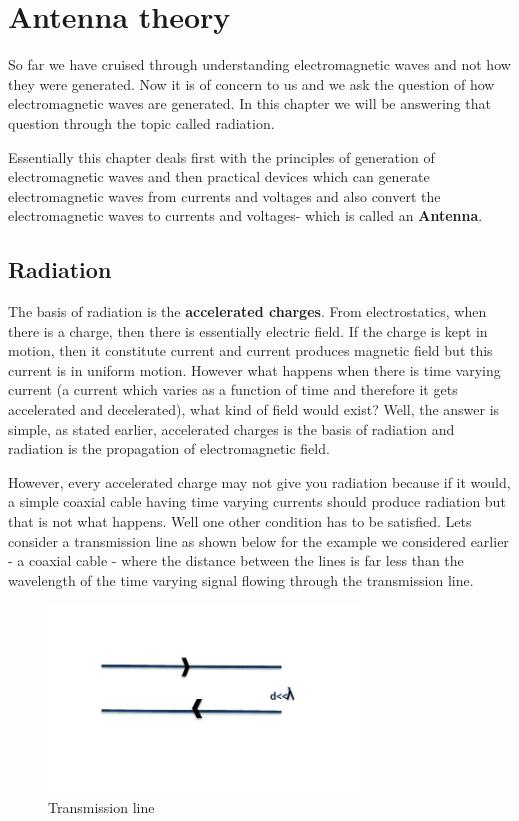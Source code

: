 \chapter{Antenna theory}
So far we have cruised through understanding electromagnetic waves and not how they were generated. Now it is of concern to us and we ask the question of how electromagnetic waves are generated. In this chapter we will be answering that question through the topic called radiation. 

Essentially this chapter deals first with the principles of generation of electromagnetic waves and then practical devices which can generate electromagnetic waves from currents and voltages and also convert the electromagnetic waves to currents and voltages- which is called an \textbf{Antenna}.

\section{Radiation}
The basis of radiation is the \textbf{accelerated charges}. From electrostatics, when there is a charge, then there is essentially electric field. If the charge is kept in motion, then it constitute current and current produces magnetic field but this current is in uniform motion. However what happens when there is time varying current (a current which varies as a function of time and therefore it gets accelerated and decelerated), what kind of field would exist? Well, the answer is simple, as stated earlier, accelerated charges is the basis of radiation and radiation is the propagation of electromagnetic field.

However, every accelerated charge may not give you radiation because if it would, a simple coaxial cable having time varying currents should produce radiation but that is not what happens. Well one other condition has to be satisfied. Lets consider a transmission line as shown below for the example we considered earlier - a coaxial cable - where the distance between the lines is far less than the wavelength of the time varying signal flowing through the transmission line.
\begin{figure}[h]
\centering
\includegraphics[height=5cm]{./graphics/fig_1}
\caption{Transmission line}
\end{figure}

